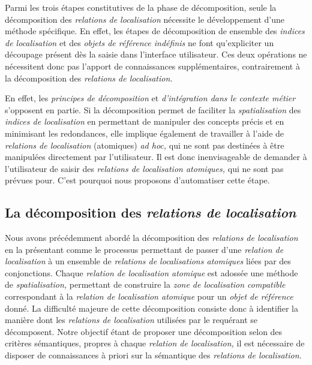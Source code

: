 Parmi les trois étapes constitutives de la phase de décomposition,
seule la décomposition des \emph{relations de localisation} nécessite
le développement d'une méthode spécifique. En effet, les étapes de
décomposition de ensemble des \emph{indices de localisation} et des
\emph{objets de référence indéfinis} ne font qu'expliciter un
découpage présent dès la saisie dans l'interface utilisateur. Ces deux
opérations ne nécessitent donc pas l'apport de connaissances
supplémentaires, contrairement à la décomposition des \emph{relations
  de localisation.}

En effet, les \emph{principes de décomposition} et \emph{d'intégration
  dans le contexte métier} s'opposent en partie. Si la décomposition
permet de faciliter la \emph{spatialisation} des \emph{indices de
  localisation} en permettant de manipuler des concepts précis et en
minimisant les redondances, elle implique également de travailler à
l'aide de \emph{relations de localisation} (atomiques) \emph{ad hoc,}
qui ne sont pas destinées à être manipulées directement par
l'utilisateur. Il est donc inenvisageable de demander à l'utilisateur
de saisir des \emph{relations de localisation atomiques,} qui ne sont
pas prévues pour. C'est pourquoi nous proposons d'automatiser cette
étape.

\subsection{La décomposition des \emph{relations de localisation}}

Nous avons précédemment abordé la décomposition des \emph{relations de
  localisation} en la présentant comme le processus permettant de
passer d'une \emph{relation de localisation} à un ensemble de
\emph{relations de localisations atomiques} liées par des
conjonctions. Chaque \emph{relation de localisation atomique} est
adossée une méthode de \emph{spatialisation,} permettant de construire
la \emph{zone de localisation compatible} correspondant à la
\emph{relation de localisation atomique} pour un \emph{objet de
  référence} donné. La difficulté majeure de cette décomposition
consiste donc à identifier la manière dont les \emph{relations de
  localisation} utilisées par le requérant se décomposent. Notre
objectif étant de proposer une décomposition selon des critères
sémantiques, propres à chaque \emph{relation de localisation,} il est
nécessaire de disposer de connaissances à priori sur la sémantique des
\emph{relations de localisation.}

